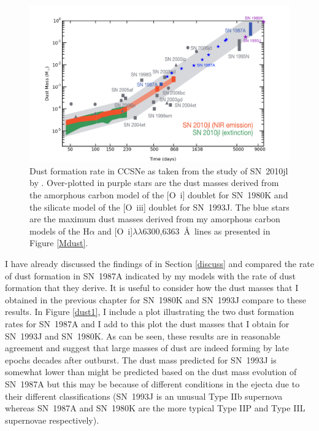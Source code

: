 \begin{figure}
\centering
\includegraphics[scale=0.5,clip=true, trim=50 0 60 30]{chapters/chapter7/figs/final_dust_plot.png}
\caption{Dust formation rate in CCSNe as taken from the study of SN~2010jl by \citet{Gall2014}.  Over-plotted in purple stars are the dust masses derived from the amorphous carbon model of the [O~{\sc i}] doublet for SN~1980K and the silicate model of the [O~{\sc iii}] doublet for SN~1993J.  The blue stars are the maximum dust masses derived from my amorphous carbon models of the H$\alpha$ and [O~{\sc i}]$\lambda\lambda$6300,6363~\AA\ lines as presented in Figure \ref{Mdust}.}
\label{dust2}
\end{figure}

I have already discussed the findings of \citet{Wesson2015} in Section \ref{discuss} and compared the rate of dust formation in SN~1987A indicated by my models with the rate of dust formation that they derive.  It is useful to consider how the dust masses that I obtained in the previous chapter for SN~1980K and SN~1993J compare to these results.  In Figure \ref{dust1}, I include a plot illustrating the two dust formation rates for SN~1987A and I add to this plot the dust masses that I obtain for SN~1993J and SN~1980K.  As can be seen, these results are in reasonable agreement and suggest that large masses of dust are indeed forming by late epochs decades after outburst.  The dust mass predicted for SN~1993J is somewhat lower than might be predicted based on the dust mass evolution of SN~1987A but this may be because of different conditions in the ejecta due to their different classifications (SN~1993J is an unusual Type IIb supernova whereas SN~1987A and SN~1980K are the more typical Type IIP and Type IIL supernovae respectively).

